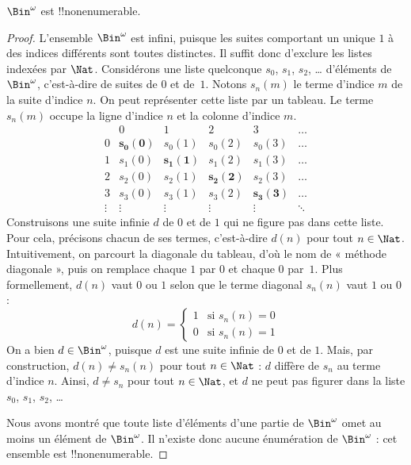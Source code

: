 \documentclass[../../../include/open-logic-section]{subfiles}
\begin{document}
\begin{thm}
$\Bin^\omega$ est !!{nonenumerable}.
\end{thm}

\begin{proof}
L’ensemble $\Bin^\omega$ est infini, puisque les suites comportant
un unique $1$ à des indices différents sont toutes distinctes.
Il suffit donc d’exclure les listes indexées par $\Nat$.
Considérons une liste quelconque $s_{0}$, $s_{1}$, $s_{2}$, \dots{}
d’éléments de $\Bin^\omega$, c’est-à-dire de suites de $0$ et de~$1$.
Notons $s_n(m)$ le terme d'indice $m$ de la suite d'indice $n$.
On peut représenter cette liste par un tableau. Le terme $s_n(m)$
occupe la ligne d'indice $n$ et la colonne d'indice $m$.
%
%
%
%
%
\[
\begin{array}{c|c|c|c|c|c}
& 0 & 1 & 2 & 3 & \dots \\\hline
0 & \mathbf{s_{0}(0)} & s_{0}(1) & s_{0}(2) & s_0(3) & \dots \\\hline
1 & s_{1}(0)& \mathbf{s_{1}(1)} & s_1(2) & s_1(3) & \dots \\\hline
2 & s_{2}(0)& s_{2}(1) & \mathbf{s_2(2)} & s_2(3) & \dots \\\hline
3 & s_{3}(0)& s_{3}(1) & s_3(2) & \mathbf{s_3(3)} & \dots \\\hline
\vdots & \vdots & \vdots & \vdots & \vdots & \mathbf{\ddots}
\end{array}
\]
Construisons une suite infinie $d$ de $0$ et de $1$ qui ne figure
pas dans cette liste. Pour cela, précisons chacun de ses termes,
c'est-à-dire $d(n)$ pour tout $n \in \Nat$. Intuitivement, on
parcourt la diagonale du tableau, d'où le nom de « méthode
diagonale », puis on remplace chaque $1$ par $0$ et chaque $0$
par~$1$.
%
%
Plus formellement, $d(n)$ vaut $0$ ou $1$ selon que le terme
diagonal $s_n(n)$ vaut $1$ ou $0$ :
\[
d(n) =
\begin{cases}
1 & \text{si $s_{n}(n) = 0$}\\
0 & \text{si $s_{n}(n) = 1$}
\end{cases}
\]
On a bien $d \in \Bin^\omega$, puisque $d$ est une suite infinie
de $0$ et de $1$. Mais, par construction, $d(n) \neq s_n(n)$
pour tout $n \in \Nat$ : $d$ diffère de $s_n$ au terme d'indice
$n$. Ainsi, $d \neq s_n$ pour tout $n\in \Nat$, et $d$ ne
peut pas figurer dans la liste $s_0$, $s_1$, $s_2$, \dots

Nous avons montré que toute liste d'éléments d'une partie de
$\Bin^\omega$ omet au moins un élément de $\Bin^\omega$.
Il n'existe donc aucune énumération de $\Bin^\omega$ : cet
ensemble est !!{nonenumerable}.
\end{proof}
\end{document}

